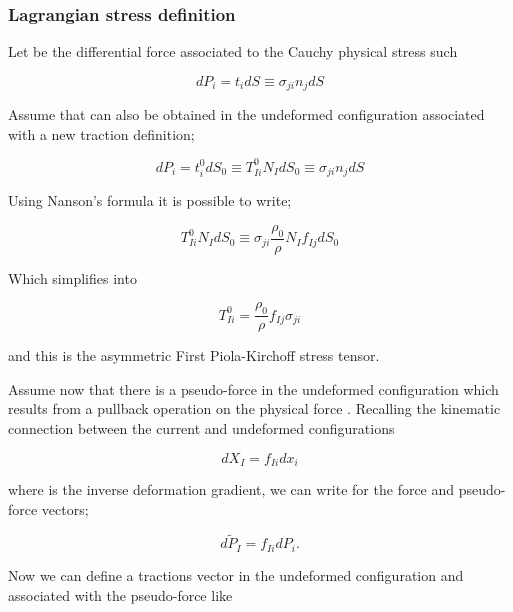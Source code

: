 \subsubsection*{Lagrangian stress definition}
Let be the differential force associated to the Cauchy physical stress such

\begin{equation}
d{P_i} = {t_i}dS \equiv {\sigma _{ji}}{n_j}dS
\label{diff stress 1}
\end{equation}

Assume that   can also be obtained in the undeformed configuration associated with a new traction definition;

\begin{equation}
d{P_i} = t_i^0d{S_0} \equiv T_{Ii}^0{N_I}d{S_0} \equiv {\sigma _{ji}}{n_j}dS
\label{diff stress 2}	
\end{equation}

Using Nanson's formula it is possible to write;

\begin{equation}
T_{Ii}^0{N_I}d{S_0} \equiv {\sigma _{ji}}\frac{{{\rho _0}}}{\rho }{N_I}{f_{Ij}}d{S_0}
\label{equiv}
\end{equation}

Which simplifies into

\begin{equation}
T_{Ii}^0 = \frac{{{\rho _0}}}{\rho }{f_{Ij}}{\sigma _{ji}}
\label{simplified}
\end{equation}

and this is the asymmetric First Piola-Kirchoff stress tensor.

Assume now that there is a pseudo-force in the undeformed configuration   which results from a pullback operation on the physical force  .  Recalling the kinematic connection between the current and undeformed configurations

\begin{equation}
d{X_I} = {f_{Ii}}d{x_i}
\label{pseudo}
\end{equation}

where   is the inverse deformation gradient, we can write for the force and pseudo-force vectors;

\begin{equation}
d{\tilde P_I} = {f_{Ii}}d{P_i}.
\label{for and psefor}
\end{equation}

Now we can define a tractions vector   in the undeformed configuration and associated with the pseudo-force   like

